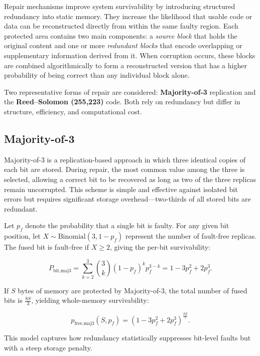 Repair mechanisms improve system survivability by introducing structured redundancy into static memory.  
They increase the likelihood that usable code or data can be reconstructed directly from within the same faulty region.  
Each protected area contains two main components: a \textit{source block} that holds the original content and one or more \textit{redundant blocks} that encode overlapping or supplementary information derived from it.  
When corruption occurs, these blocks are combined algorithmically to form a reconstructed version that has a higher probability of being correct than any individual block alone.

Two representative forms of repair are considered: \textbf{Majority-of-3} replication and the \textbf{Reed--Solomon (255,223)} code.  
Both rely on redundancy but differ in structure, efficiency, and computational cost.  

\subsection{Majority-of-3}

Majority-of-3 is a replication-based approach in which three identical copies of each bit are stored.  
During repair, the most common value among the three is selected, allowing a correct bit to be recovered as long as two of the three replicas remain uncorrupted.  
This scheme is simple and effective against isolated bit errors but requires significant storage overhead—two-thirds of all stored bits are redundant.

Let $p_f$ denote the probability that a single bit is faulty.  
For any given bit position, let $X \sim \mathrm{Binomial}(3, 1 - p_f)$ represent the number of fault-free replicas.  
The fused bit is fault-free if $X \ge 2$, giving the per-bit survivability:

\begin{equation}
P_{\text{bit,maj3}} = \sum_{k=2}^{3} \binom{3}{k} (1 - p_f)^k p_f^{3-k} = 1 - 3p_f^2 + 2p_f^3.
\end{equation}

If $S$ bytes of memory are protected by Majority-of-3, the total number of fused bits is $\tfrac{8S}{3}$, yielding whole-memory survivability:

\begin{equation}
p_{\text{free,maj3}}(S, p_f) = (1 - 3p_f^2 + 2p_f^3)^{\tfrac{8S}{3}}.
\end{equation}

This model captures how redundancy statistically suppresses bit-level faults but with a steep storage penalty.

